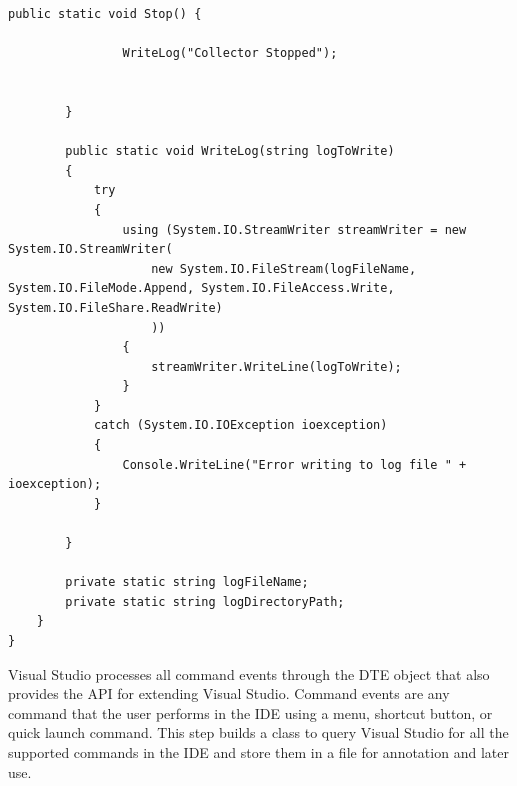 \begin{Answer}
\begin{lstlisting}[caption=Data Recorder Class,  label=code:DataRecorder]
        public static void Stop() {

                WriteLog("Collector Stopped");
            
        
        }

        public static void WriteLog(string logToWrite)
        {
            try
            {
                using (System.IO.StreamWriter streamWriter = new System.IO.StreamWriter(
                    new System.IO.FileStream(logFileName, System.IO.FileMode.Append, System.IO.FileAccess.Write, System.IO.FileShare.ReadWrite)
                    ))
                {
                    streamWriter.WriteLine(logToWrite);
                }
            }
            catch (System.IO.IOException ioexception)
            {
                Console.WriteLine("Error writing to log file " + ioexception);
            }
        
        }

        private static string logFileName;
        private static string logDirectoryPath;
    }
}

\end{lstlisting}
\end{Answer}


\newpage
Visual Studio processes all command events through the DTE object that also provides the API for extending Visual Studio.  Command events are any command that the user performs in the IDE using a menu, shortcut button, or quick launch command. This step builds a class to query Visual Studio for all the supported commands in the IDE and store them in a file for annotation and later use.  


